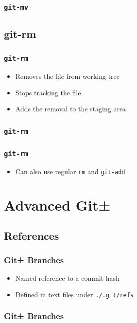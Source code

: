 \documentclass{beamer}
\begin{document}
\begin{frame}
\frametitle{\texttt{git-mv}}

\end{frame}

\subsection{git-rm}
\begin{frame}
\frametitle{\texttt{git-rm}}
\begin{itemize}
\item{Removes the file from working tree}
\item{Stops tracking the file}
\item{Adds the removal to the staging area}
\end{itemize}
\end{frame}

\begin{frame}[fragile]
\frametitle{\texttt{git-rm}}

\end{frame}

\begin{frame}
\frametitle{\texttt{git-rm}}
\begin{itemize}
\item{Can also use regular \texttt{rm} and \texttt{git-add}}
\end{itemize}
\end{frame}

\section{Advanced Git±}
\subsection{References}
\begin{frame}
\frametitle{Git± Branches}
\begin{itemize}
\item<2->{Named reference to a commit hash}
\item<3->{Defined in text files under \texttt{./.git/refs}}
\end{itemize}
\end{frame}

\begin{frame}[fragile]
\frametitle{Git± Branches}

\end{frame}
\end{document}
